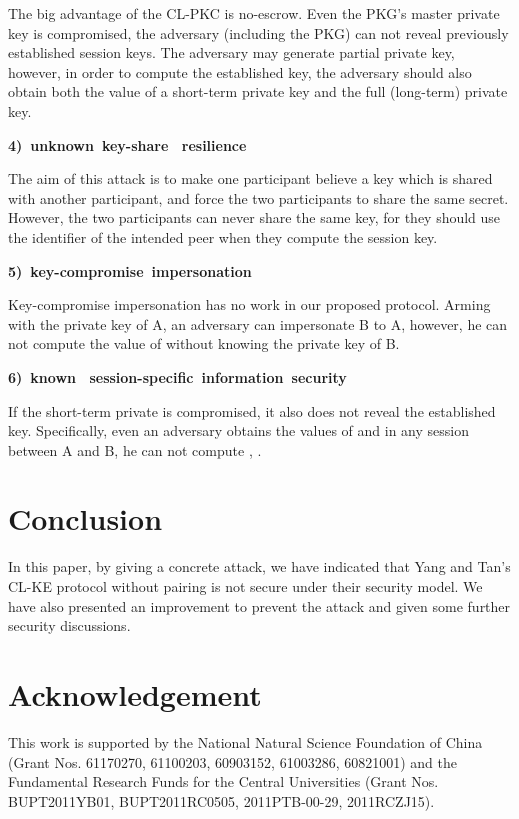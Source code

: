 \documentclass[final,1p,times,twocolumn]{elsarticle}
\begin{document}
The big advantage of the CL-PKC is no-escrow. Even the PKG's master private key is compromised, the adversary (including the PKG) can not reveal previously established session keys. The adversary may generate partial private key, however, in order to compute the established key, the adversary should also obtain both the value of a short-term private key and the full (long-term) private key.

{\bf 4)\  unknown\  key-share \ resilience}

The aim of this attack is to make one participant believe a key which is shared with another participant, and force the two participants to share the same secret. However, the two participants can never share the same key, for they should use the identifier of the intended peer when they compute the session key.


{\bf 5)\  key-compromise\  impersonation}

Key-compromise impersonation has no work in our proposed protocol. Arming with the private key of A, an adversary can impersonate B to A, however, he can not compute the value of  without knowing the private key of B.


{\bf 6)\  known \ session-specific\  information\  security}

If the short-term private is compromised, it also does not reveal the established key. Specifically, even an adversary obtains the values of  and  in any session between A and B, he can not compute , .


\section{Conclusion }
\label{6}

 In this paper, by giving a concrete attack, we have indicated that Yang and Tan's CL-KE protocol without pairing is  not secure under their security model. We have also presented an improvement to prevent the attack and given some further security discussions.



\section*{Acknowledgement}

This work is supported by the National Natural Science Foundation of China (Grant Nos. 61170270, 61100203, 60903152, 61003286, 60821001) and the
 Fundamental Research Funds for the Central Universities (Grant Nos. BUPT2011YB01, BUPT2011RC0505, 2011PTB-00-29, 2011RCZJ15).
\end{document}
